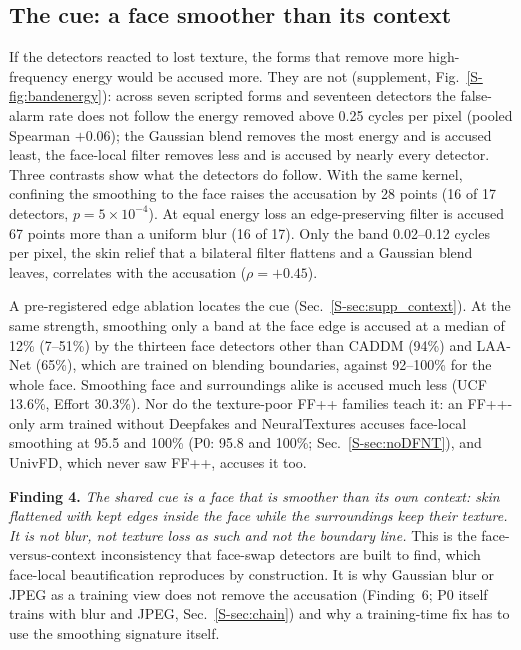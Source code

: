 \documentclass[conference]{IEEEtran}
\begin{document}
\subsection{The cue: a face smoother than its context}
\label{sec:signature}

If the detectors reacted to lost texture, the forms that remove more high-frequency energy would be accused more. They are
not (supplement, Fig.~\ref{S-fig:bandenergy}): across seven scripted forms and seventeen detectors the false-alarm rate does not follow the
energy removed above 0.25 cycles per pixel (pooled Spearman $+0.06$);
the Gaussian blend removes the most energy and is accused least, the face-local filter removes less and is accused by
nearly every detector. Three contrasts show what the detectors do follow. With the same kernel, confining the smoothing to
the face raises the accusation by 28 points (16 of 17 detectors, $p=5\times10^{-4}$). At equal energy loss an
edge-preserving filter is accused 67 points more than a uniform blur (16 of 17). Only the band 0.02--0.12 cycles per
pixel, the skin relief that a bilateral filter flattens and a Gaussian blend leaves, correlates with the accusation
($\rho=+0.45$).

A pre-registered edge ablation locates the cue (Sec.~\ref{S-sec:supp_context}). At the same strength, smoothing only a band
at the face edge is accused at a median of 12\% (7--51\%) by the thirteen face detectors other than CADDM (94\%) and LAA-Net
(65\%), which are trained on blending boundaries, against 92--100\% for the whole face. Smoothing face and surroundings
alike is accused much less (UCF 13.6\%, Effort 30.3\%).
Nor do the texture-poor FF++ families teach it: an FF++-only arm trained without Deepfakes and NeuralTextures accuses
face-local smoothing at 95.5 and 100\% (P0: 95.8 and 100\%; Sec.~\ref{S-sec:noDFNT}), and UnivFD, which never saw FF++, accuses
it too.

\textbf{Finding 4.} \emph{The shared cue is a face that is smoother than its own context: skin flattened with kept edges
inside the face while the surroundings keep their texture. It is not blur, not texture loss as such and not the boundary
line.} This is the face-versus-context inconsistency that face-swap detectors are built to find, which face-local
beautification reproduces by construction. It is why Gaussian blur or JPEG as a training view does not remove the accusation (Finding~6; P0 itself trains with blur and JPEG, Sec.~\ref{S-sec:chain}) and why a training-time fix has to use the smoothing signature itself.
\end{document}
